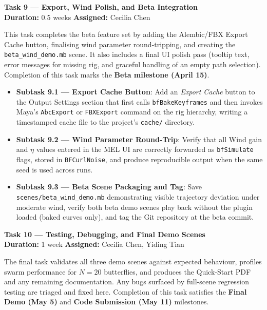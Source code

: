 \documentclass[12pt]{article}
\begin{document}
\bigskip
\noindent\textbf{Task 9 --- Export, Wind Polish, and Beta Integration}\\
\textbf{Duration:} 0.5 weeks \quad \textbf{Assigned:} Cecilia Chen

This task completes the beta feature set by adding the Alembic/FBX Export Cache
button, finalising wind parameter round-tripping, and creating the
\texttt{beta\_wind\_demo.mb} scene. It also includes a final UI polish pass
(tooltip text, error messages for missing rig, and graceful handling of an empty
path selection). Completion of this task marks the \textbf{Beta milestone
(April 15)}.

\begin{itemize}
  \item \textbf{Subtask 9.1 --- Export Cache Button}: Add an \textit{Export Cache}
    button to the Output Settings section that first calls \texttt{bfBakeKeyframes}
    and then invokes Maya's \texttt{AbcExport} or \texttt{FBXExport} command on the
    rig hierarchy, writing a timestamped cache file to the project's
    \texttt{cache/} directory.
  \item \textbf{Subtask 9.2 --- Wind Parameter Round-Trip}: Verify that all Wind
    gain and $\eta$ values entered in the MEL UI are correctly forwarded as
    \texttt{bfSimulate} flags, stored in \texttt{BFCurlNoise}, and produce
    reproducible output when the same seed is used across runs.
  \item \textbf{Subtask 9.3 --- Beta Scene Packaging and Tag}: Save
    \texttt{scenes/beta\_wind\_demo.mb} demonstrating visible trajectory deviation
    under moderate wind, verify both beta demo scenes play back without the plugin
    loaded (baked curves only), and tag the Git repository at the beta commit.
\end{itemize}

\bigskip
\noindent\textbf{Task 10 --- Testing, Debugging, and Final Demo Scenes}\\
\textbf{Duration:} 1 week \quad \textbf{Assigned:} Cecilia Chen, Yiding Tian

The final task validates all three demo scenes against expected behaviour, profiles
swarm performance for $N=20$ butterflies, and produces the Quick-Start PDF and any
remaining documentation. Any bugs surfaced by full-scene regression testing are
triaged and fixed here. Completion of this task satisfies the \textbf{Final Demo
(May 5)} and \textbf{Code Submission (May 11)} milestones.
\end{document}
